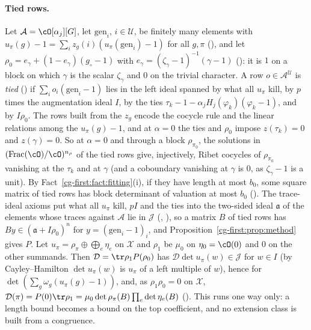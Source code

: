 \paragraph{Tied rows.} Let $\mathcal A=\cO[\alpha_j][G]$, let $\mathrm{gen}_i$, $i\in\mathcal U$, be finitely many elements with
$u_\pi(g)-1=\sum_iz_g(i)(u_\pi(\mathrm{gen}_i)-1)$ for all $g,\pi$
(), and let $\rho_0=e_\gamma+(1-e_\gamma)(g_\circ-1)$ with
$e_\gamma=(\zeta_\gamma-1)^{-1}(\gamma-1)$ (): it is $1$ on a block on which $\gamma$
is the scalar $\zeta_\gamma$ and $0$ on the trivial character. A row $o\in\mathcal A^{\mathcal U}$ is \emph{tied}
() if $\sum_io_i(\mathrm{gen}_i-1)$ lies in the left ideal spanned by what all
$u_\pi$ kill, by $p$ times the augmentation ideal $I$, by the ties
$\tau_k-1-\alpha_jH_j(\varphi_k)(\varphi_k-1)$, and by $I\rho_0$. The rows built from the $z_g$ encode the
cocycle rule and the linear relations among the $u_\pi(g)-1$, and at $\alpha=0$ the ties and $\rho_0$ impose
$z(\tau_k)=0$ and $z(\gamma)=0$. So at $\alpha=0$ and through a block $\rho_{\pi_0}$, the solutions in
$(\mathrm{Frac}(\cO)/\cO)^{n_\rho}$ of the tied rows give, injectively, Ribet cocycles of $\rho_{\pi_0}$ vanishing at the $\tau_k$
and at $\gamma$ (and a coboundary vanishing at $\gamma$ is $0$, as $\zeta_\gamma-1$ is a unit). By
Fact~\ref{cg-first:fact:fitting}(i), if they have length at most $b_0$, some square matrix of tied rows
has block determinant of valuation at most $b_0$ ().
The trace-ideal axioms put what all $u_\pi$ kill, $p I$ and the ties into the two-sided ideal $\mathfrak a$
of the elements whose traces against $\mathcal A$ lie in $\mathcal J$ (,
), so a matrix $B$ of tied rows has $By\in(\mathfrak a+I\rho_0)^n$ for
$y=(\mathrm{gen}_i-1)_i$, and Proposition~\ref{cg-first:prop:method} gives $P$. Let $u_\pi=\rho_\pi\oplus
\bigoplus_e\eta_e$ on $\mathcal X$ and $\rho_1$ be $\mu_0$ on $\eta_0=\cO(0)$ and $0$ on the other summands.
Then $\mathcal D=\tr\rho_1P(\rho_0)$ has $\mathcal D\det u_\pi(w)\in\mathcal J$ for $w\in I$ (by Cayley--Hamilton $\det u_\pi(w)$
is $u_\pi$ of a left multiple of $w$), hence for $\det(\sum_g\omega_g(u_\pi(g)-1))$, and, as
$\rho_1\rho_0=0$ on $\mathcal X$, $\mathcal D(\pi)=P(0)\tr\rho_1=\mu_0\det\rho_\pi(B)\prod_e\det\eta_e(B)$
(). This runs one way only: a length bound becomes a
bound on the top coefficient, and no extension class is built from a congruence.

